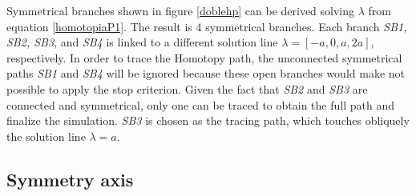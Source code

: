 \documentclass[conference,letterpaper,onecolumn]{IEEEtran}
\begin{document}
Symmetrical branches shown in figure \ref{doblehp} can be derived solving $\lambda$ from equation \ref{homotopiaP1}. The result is 4 symmetrical branches. Each branch {\it SB1, SB2, SB3}, and {\it SB4} is linked to a different solution line $\lambda=[-a,0,a,2a]$, respectively. In order to trace the Homotopy path, the unconnected symmetrical paths {\it SB1} and {\it SB4} will be ignored because these open branches would make not possible to apply the stop criterion. Given the fact that {\it SB2} and {\it SB3} are connected and symmetrical, only one can be traced to obtain the full path and finalize the simulation. {\it SB3} is chosen as the tracing path, which touches obliquely the solution line $\lambda=a$.

\begin{table}[tbp]
\caption{Symmetrical branches}
\label{ramasx}
\end{table} 


\subsection{Symmetry axis}
\end{document}
